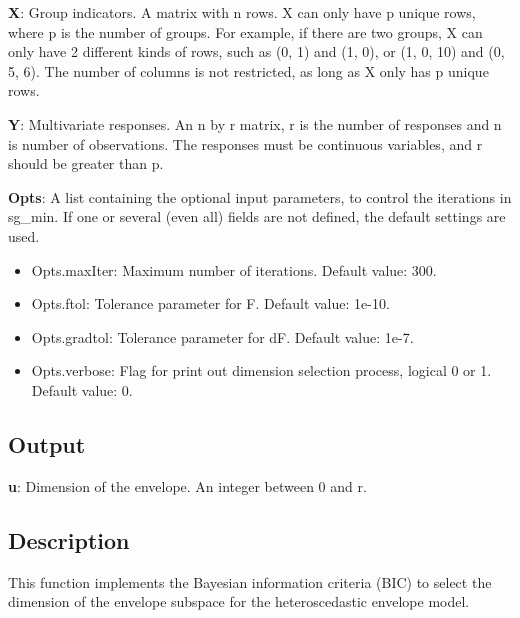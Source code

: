 \documentclass[a4paper,11pt,openany]{memoir}
\begin{document}
\begin{par}
\textbf{X}: Group indicators. A matrix with n rows.  X can only have p unique  rows, where p is the number of groups. For example, if there are two groups, X can only have 2 different kinds of rows, such as (0, 1) and (1, 0), or (1, 0, 10) and (0, 5, 6).  The number of columns is not restricted, as long as X only has p unique rows.
\end{par} \vspace{1em}
\begin{par}
\textbf{Y}: Multivariate responses. An n by r matrix, r is the number of responses and n is number of observations. The responses must be continuous variables, and r should be greater than p.
\end{par} \vspace{1em}
\begin{par}
\textbf{Opts}: A list containing the optional input parameters, to control the iterations in sg\_min. If one or several (even all) fields are not defined, the default settings are used.
\end{par} \vspace{1em}
\begin{itemize}
\setlength{\itemsep}{-1ex}
   \item Opts.maxIter: Maximum number of iterations.  Default value: 300.
   \item Opts.ftol: Tolerance parameter for F.  Default value: 1e-10.
   \item Opts.gradtol: Tolerance parameter for dF.  Default value: 1e-7.
   \item Opts.verbose: Flag for print out dimension selection process, logical 0 or 1. Default value: 0.
\end{itemize}


\subsection*{Output}

\begin{par}
\textbf{u}: Dimension of the envelope. An integer between 0 and r.
\end{par} \vspace{1em}


\subsection*{Description}

\begin{par}
This function implements the Bayesian information criteria (BIC) to select the dimension of the envelope subspace for the heteroscedastic envelope model.
\end{par} \vspace{1em}
\end{document}
